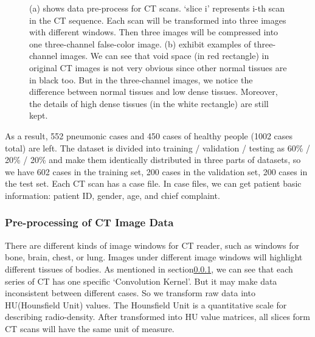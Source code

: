 \documentclass[journal]{IEEEtran}
\begin{document}
\begin{figure}[htbp]
    \centering
    \caption{(a) shows data pre-process for CT scans. `slice i' represents i-th scan in the CT sequence. Each scan will be transformed into three images with different windows. Then three images will be compressed into one three-channel false-color image.
    (b) exhibit examples of three-channel images. We can see that void space (in red rectangle) in original CT images is not very obvious since other normal tissues are in black too. But in the three-channel images, we notice the difference between normal tissues and low dense tissues. Moreover, the details of high dense tissues (in the white rectangle) are still kept.
    }
    \label{3channel}
    \end{figure}

As a result, 552 pneumonic cases and 450 cases of healthy people (1002 cases total) are left.
The dataset is divided into training / validation / testing as 60\% / 20\% / 20\% and make them identically distributed in three parts of datasets, so we have 602 cases in the training set, 200 cases in the validation set, 200 cases in the test set.
Each CT scan has a case file. In case files, we can get patient basic information: patient ID, gender, age, and chief complaint. 

\subsubsection{Pre-processing of CT Image Data}
\label{ctimagedata}
There are different kinds of image windows for CT reader, such as windows for bone, brain, chest, or lung. Images under different image windows will highlight different tissues of bodies.
As mentioned in section\ref{ctimagedata}, we can see that each series of CT has one specific `Convolution Kernel'. But it may make data inconsistent between different cases. So we transform raw data into HU(Hounsfield Unit) values. The Hounsfield Unit is a quantitative scale for describing radio-density. After transformed into HU value matrices, all slices form CT scans will have the same unit of measure.
\end{document}
